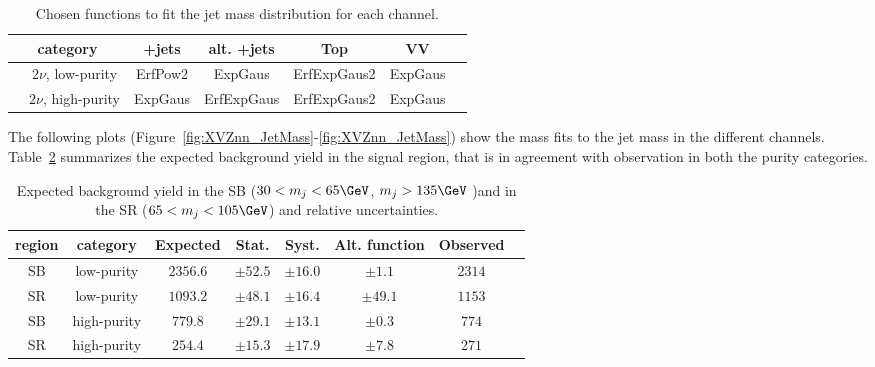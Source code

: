 \begin{table}[!htb]
  \begin{center}
    \begin{tabular}{cc|ccccc}
      \multicolumn{2}{c}{category} & \V+jets & alt. \V+jets & Top & VV \\
      \hline
      & $2\nu$, low-purity  & ErfPow2 & ExpGaus & ErfExpGaus2 & ExpGaus \\
      \hline
      & $2\nu$, high-purity & ExpGaus & ErfExpGaus & ErfExpGaus2 & ExpGaus \\
      \hline
    \end{tabular}
  \end{center}
  \caption{Chosen functions to fit the jet mass distribution for each channel.}\label{tab:MassFunctions}
\end{table}

The following plots (Figure~\ref{fig:XVZnn_JetMass}-\ref{fig:XVZnn_JetMass}) show the mass fits to the jet mass in the different channels. Table~\ref{tab:BkgNorm} summarizes the expected background yield in the signal region, that is in agreement with observation in both the purity categories.


\begin{table}[!htb]
  \begin{center}
    \begin{tabular}{cc|cccccc}
      region & category   & Expected  & Stat.       & Syst.      & Alt. function & Observed \\
      \hline
      SB     & low-purity & $2356.6$ & $\pm 52.5$ & $\pm 16.0$ & $\pm 1.1$    & $2314$ \\
      SR     & low-purity & $1093.2$  & $\pm 48.1$ & $\pm 16.4$ & $\pm 49.1$   & $1153$ \\
      \hline
      SB & high-purity    & $779.8$  & $\pm 29.1$ & $\pm 13.1$ & $\pm 0.3$  & $774$ \\
      SR & high-purity    & $254.4$  & $\pm 15.3$ & $\pm 17.9$ & $\pm 7.8$  & $271$ \\
      \hline
    \end{tabular}
  \end{center}
  \caption{Expected background yield in the SB ($30 < m_j < 65\GeV$, $m_j > 135\GeV$ )and in the SR ($65 < m_j < 105\GeV$) and relative uncertainties.}\label{tab:BkgNorm}
\end{table}

\clearpage


